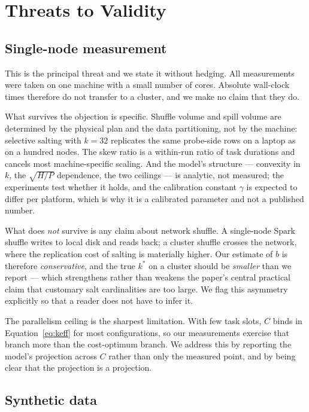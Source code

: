 \section{Threats to Validity}
\label{sec:threats}

\subsection{Single-node measurement}

This is the principal threat and we state it without hedging. All measurements
were taken on one machine with a small number of cores. Absolute wall-clock
times therefore do not transfer to a cluster, and we make no claim that they
do.

What survives the objection is specific. Shuffle volume and spill volume are
determined by the physical plan and the data partitioning, not by the machine:
selective salting with $k=32$ replicates the same probe-side rows on a laptop
as on a hundred nodes. The skew ratio is a within-run ratio of task durations
and cancels most machine-specific scaling. And the model's structure ---
convexity in $k$, the $\sqrt{H/P}$ dependence, the two ceilings --- is
analytic, not measured; the experiments test whether it holds, and the
calibration constant $\gamma$ is expected to differ per platform, which is why
it is a calibrated parameter and not a published number.

What does \emph{not} survive is any claim about network shuffle. A single-node
Spark shuffle writes to local disk and reads back; a cluster shuffle crosses the
network, where the replication cost of salting is materially higher. Our
estimate of $b$ is therefore \emph{conservative}, and the true $k^{*}$ on a
cluster should be \emph{smaller} than we report --- which strengthens rather
than weakens the paper's central practical claim that customary salt
cardinalities are too large. We flag this asymmetry explicitly so that a reader
does not have to infer it.

The parallelism ceiling is the sharpest limitation. With few task slots, $C$
binds in Equation~\eqref{eq:keff} for most configurations, so our measurements
exercise that branch more than the cost-optimum branch. We address this by
reporting the model's projection across $C$ rather than only the measured
point, and by being clear that the projection is a projection.

\subsection{Synthetic data}


